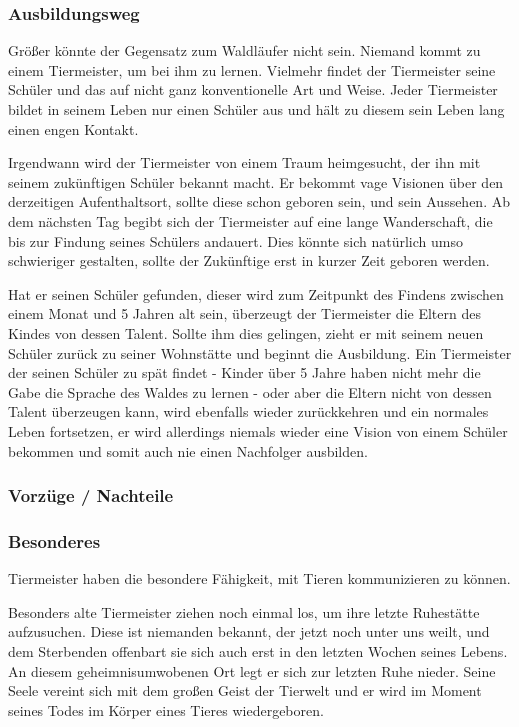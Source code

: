 \subsubsection{Ausbildungsweg}
\par Größer könnte der Gegensatz zum Waldläufer nicht sein. Niemand kommt zu einem Tiermeister, um bei ihm 
zu lernen. Vielmehr findet der Tiermeister seine Schüler und das auf nicht ganz konventionelle Art und Weise. 
Jeder Tiermeister bildet in seinem Leben nur einen Schüler aus und hält zu diesem sein Leben lang einen engen 
Kontakt.
\par Irgendwann wird der Tiermeister von einem Traum heimgesucht, der ihn mit seinem zukünftigen Schüler bekannt
 macht. Er bekommt vage Visionen über den derzeitigen Aufenthaltsort, sollte diese schon geboren sein, und sein 
 Aussehen. Ab dem nächsten Tag begibt sich der Tiermeister auf eine lange Wanderschaft, die bis zur Findung seines 
 Schülers andauert. Dies könnte sich natürlich umso schwieriger gestalten, sollte der Zukünftige erst in kurzer 
 Zeit geboren werden.
\par Hat er seinen Schüler gefunden, dieser wird zum Zeitpunkt des Findens zwischen einem Monat und 5 Jahren alt 
sein, überzeugt der Tiermeister die Eltern des Kindes von 
dessen Talent. Sollte ihm dies gelingen, zieht er mit seinem neuen Schüler zurück zu seiner Wohnstätte und 
beginnt die Ausbildung. Ein Tiermeister der seinen Schüler zu spät findet - Kinder über 5 Jahre haben nicht mehr
die Gabe die Sprache des Waldes zu lernen - oder aber die Eltern nicht von dessen Talent überzeugen kann, wird
 ebenfalls wieder zurückkehren und ein normales Leben 
fortsetzen, er wird allerdings niemals wieder eine Vision von einem Schüler bekommen und somit auch nie einen
 Nachfolger ausbilden.
\subsubsection{Vorzüge / Nachteile}
\subsubsection{Besonderes}
\par Tiermeister haben die besondere Fähigkeit, mit Tieren kommunizieren zu können.
\par Besonders alte Tiermeister ziehen noch einmal los, um ihre letzte Ruhestätte aufzusuchen. Diese ist niemanden 
bekannt, der jetzt noch unter uns weilt, und dem Sterbenden offenbart sie sich auch erst in den letzten Wochen 
seines Lebens. An diesem geheimnisumwobenen Ort legt er sich zur letzten Ruhe nieder. Seine Seele vereint sich mit 
dem großen Geist der Tierwelt und er wird im Moment seines Todes im Körper eines Tieres wiedergeboren.
